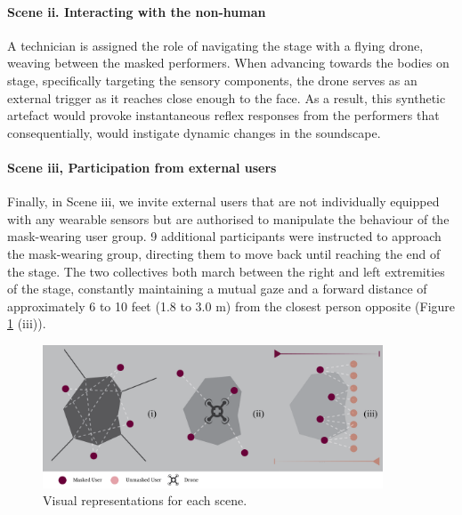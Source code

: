 \paragraph{Scene ii. Interacting with the non-human}

A technician is assigned the role of navigating the stage with a flying drone, weaving between the masked performers. When advancing towards the bodies on stage, specifically targeting the sensory components, the drone serves as an external trigger as it reaches close enough to the face. As a result, this synthetic artefact would provoke instantaneous reflex responses from the performers that consequentially, would instigate dynamic changes in the soundscape.

\paragraph{Scene iii, Participation from external users}

Finally, in Scene iii, we invite external users that are not individually equipped with any wearable sensors but are authorised to manipulate the behaviour of the mask-wearing user group. 9 additional participants were instructed to approach the mask-wearing group, directing them to move back until reaching the end of the stage. The two collectives both march between the right and left extremities of the stage, constantly maintaining a mutual gaze and a forward distance of approximately 6 to 10 feet (1.8 to 3.0 m) from the closest person opposite (Figure \ref{fig1:structure} (iii)).

\begin{figure}[!h]
\centering
\includegraphics[width=0.9\textwidth,keepaspectratio]{Chapters/Figures/adse_ess/scenes_w_keycode.png}
{\caption{Visual representations for each scene.}\label{fig1:structure}}
\end{figure}

